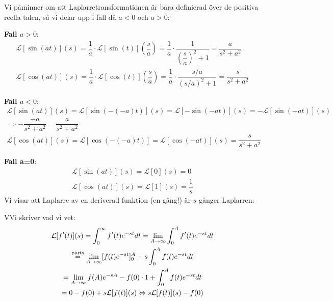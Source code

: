 \par\bigskip
\noindent Vi påminner om att Laplarretransformationen är bara definierad över de positiva reella talen, så vi delar upp i fall då $a<0$ och $a>0$:
\par\bigskip
\textbf{Fall $a>0$}:
\begin{equation*}
  \begin{gathered}
    \mathcal{L}[\sin(at)](s) = \dfrac{1}{a}\cdot\mathcal{L}[\sin(t)]\left(\dfrac{s}{a}\right) = \dfrac{1}{a}\cdot\dfrac{1}{\left(\dfrac{s}{a}\right)^2+1} = \dfrac{a}{s^2+a^2}\\
    \mathcal{L}[\cos(at)](s) = \dfrac{1}{a}\cdot\mathcal{L}[\cos(t)]\left(\dfrac{s}{a}\right) = \dfrac{1}{a}\cdot\dfrac{s/a}{(s/a)^2+1} = \dfrac{s}{s^2+a^2}
  \end{gathered}
\end{equation*}
\par\bigskip
\textbf{Fall $a<0$}:
\begin{equation*}
  \begin{gathered}
    \mathcal{L}[\sin(at)](s) = \mathcal{L}[\sin(-(-a)t)](s) = \mathcal{L}[-\sin(-at)](s) = -\mathcal{L}[\sin(-at)](s)\\
    \Rightarrow -\dfrac{-a}{s^2+a^2} = \dfrac{a}{s^2+a^2}\\
    \mathcal{L}[\cos(at)](s) = \mathcal{L}[\cos(-(-a)t)] = \mathcal{L}[\cos(-at)](s) = \dfrac{s}{s^2+a^2}
  \end{gathered}
\end{equation*}
\par\bigskip
\textbf{Fall a=0}:
\begin{equation*}
  \begin{gathered}
    \mathcal{L}[\sin(at)](s) = \mathcal{L}[0](s) = 0\\
    \mathcal{L}[\cos(at)](s) = \mathcal{L}[1](s) = \dfrac{1}{s}
  \end{gathered}
\end{equation*}
\newpage
\noindent Vi visar att Laplarre av en deriverad funktion (en gång!) är $s$ gånger Laplarren:
\par\bigskip
\begin{prf}
  VVi skriver vad vi vet:
  \begin{equation*}
    \begin{gathered}
      \mathcal{L}[f^{\prime}(t)](s) = \int_{0}^{\infty}f^{\prime}(t)e^{-st}dt = \lim_{A\to\infty}\int_{0}^{A}f^{\prime}(t)e^{-st}dt\\
      \stackrel{\text{parts}}{=} \lim_{A\to\infty}[f(t)e^{-st}]_0^A+s\int_{0}^{A}f(t)e^{-st}dt\\
      =\lim_{A\to\infty} f(A)e^{-sA}-f(0)\cdot1+\int_{0}^{A}f(t)e^{-st}dt\\
      = 0-f(0)+s\mathcal{L}[f(t)](s)\Leftrightarrow s\mathcal{L}[f(t)](s)-f(0)
    \end{gathered}
  \end{equation*}
\end{prf}
